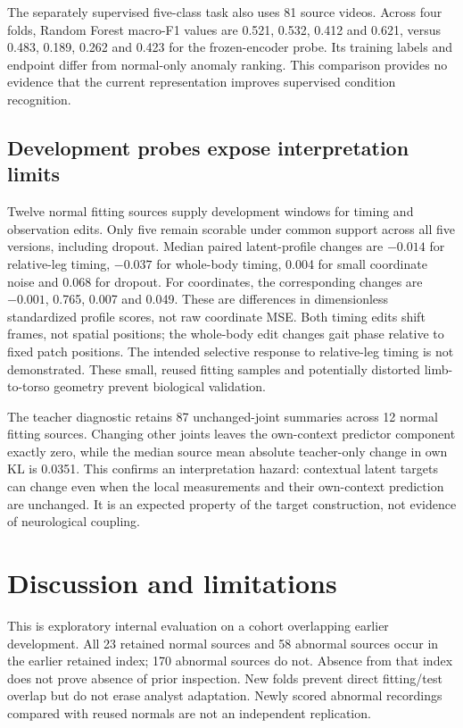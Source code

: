 \documentclass[letterpaper]{article}
\begin{document}
The separately supervised five-class task also uses 81 source videos. Across four folds, Random Forest macro-F1 values are 0.521, 0.532, 0.412 and 0.621, versus 0.483, 0.189, 0.262 and 0.423 for the frozen-encoder probe. Its training labels and endpoint differ from normal-only anomaly ranking. This comparison provides no evidence that the current representation improves supervised condition recognition.

\subsection{Development probes expose interpretation limits}

Twelve normal fitting sources supply development windows for timing and observation edits. Only five remain scorable under common support across all five versions, including dropout. Median paired latent-profile changes are \(-0.014\) for relative-leg timing, \(-0.037\) for whole-body timing, 0.004 for small coordinate noise and 0.068 for dropout. For coordinates, the corresponding changes are \(-0.001\), 0.765, 0.007 and 0.049. These are differences in dimensionless standardized profile scores, not raw coordinate MSE. Both timing edits shift frames, not spatial positions; the whole-body edit changes gait phase relative to fixed patch positions. The intended selective response to relative-leg timing is not demonstrated. These small, reused fitting samples and potentially distorted limb-to-torso geometry prevent biological validation.

The teacher diagnostic retains 87 unchanged-joint summaries across 12 normal fitting sources. Changing other joints leaves the own-context predictor component exactly zero, while the median source mean absolute teacher-only change in own KL is 0.0351. This confirms an interpretation hazard: contextual latent targets can change even when the local measurements and their own-context prediction are unchanged. It is an expected property of the target construction, not evidence of neurological coupling.

\section{Discussion and limitations}

This is exploratory internal evaluation on a cohort overlapping earlier development. All 23 retained normal sources and 58 abnormal sources occur in the earlier retained index; 170 abnormal sources do not. Absence from that index does not prove absence of prior inspection. New folds prevent direct fitting/test overlap but do not erase analyst adaptation. Newly scored abnormal recordings compared with reused normals are not an independent replication.
\end{document}
